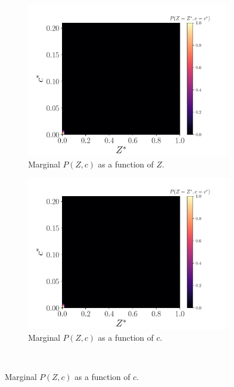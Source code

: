 \documentclass[review]{elsarticle}
\begin{document}
\begin{figure}[!tbp]%
  \centering%
  \begin{subfigure}[t]{0.48\textwidth}%
    \includegraphics[page=9,width=\textwidth, trim=0.5cm 0cm 1.5cm 1.1cm, clip=true]{./figs/pdfs_dice_0004.pdf}%
    \caption{Marginal $P(Z,c)$ as a function of $Z$.}%
  \end{subfigure}\hfill%
  \begin{subfigure}[t]{0.48\textwidth}%
    \includegraphics[page=10,width=\textwidth, trim=0.5cm 0cm 1.5cm 1.1cm, clip=true]{./figs/pdfs_dice_0004.pdf}%
    \caption{Marginal $P(Z,c)$ as a function of $c$.}%
  \end{subfigure}\\%

\end{figure}
\end{document}
